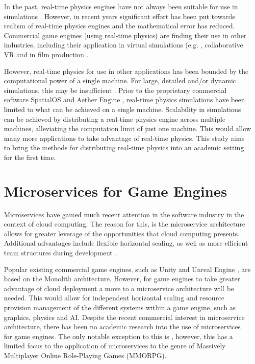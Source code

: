 In the past, real-time physics engines have not always been suitable for use in simulations \cite{Boeing2007}. However, in recent years significant effort has been put towards realism of real-time physics engines and the mathematical error has reduced. Commercial game engines (using real-time physics) are finding their use in other industries, including their application in virtual simulations (e.g. \cite{Xu2017, Lu2017, Shah2018}, collaborative VR \cite{NVIDIAHolodeck} and in film production \cite{mehta2015animated}.


However, real-time physics for use in other applications has been bounded by the computational power of a single machine. For large, detailed and/or dynamic simulations, this may be insufficient \cite{koszela2018distributed}. Prior to the proprietary commercial software SpatialOS \cite{SpatialOS} and Aether Engine \cite{AetherEngine}, real-time physics simulations have been limited to what can be achieved on a single machine. Scalability in simulations can be achieved by distributing a real-time physics engine across multiple machines, alleviating the computation limit of just one machine. This would allow many more applications to take advantage of real-time physics. This study aims to bring the methods for distributing real-time physics into an academic setting for the first time.

\section{Microservices for Game Engines}
Microservices have gained much recent attention in the software industry in the context of cloud computing. The reason for this, is the microservice architecture allows for greater leverage of the opportunities that cloud computing presents. Additional advantages include flexible horizontal scaling, as well as more efficient team structures during development \cite{2017ExtractionofMicroservices}.

Popular existing commercial game engines, such as Unity \cite{Unity} and Unreal Engine \cite{Unreal}, are based on the Monolith architecture. However, for game engines to take greater advantage of cloud deployment a move to a microservice architecture will be needed. This would allow for independent horizontal scaling and resource provision management of the different systems within a game engine, such as graphics, physics and AI. Despite the recent commercial interest in microservice architecture, there has been no academic research into the use of microservices for game engines. The only notable exception to this is \cite{vaha2017applying}, however, this has a limited focus to the application of microservices to the genre of Massively Multiplayer Online Role-Playing Games (MMORPG).

